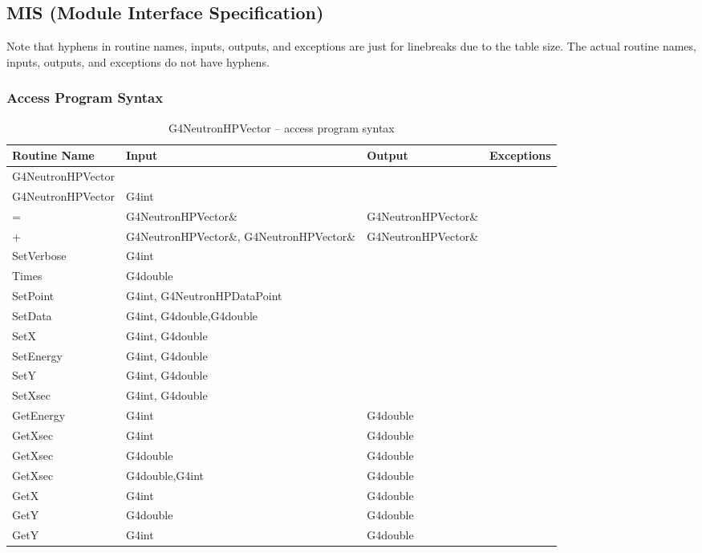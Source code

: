 \documentclass[12pt]{article}
\begin{document}
\subsection{MIS (Module Interface Specification)}
Note that hyphens in routine names, inputs, outputs, and exceptions are just for linebreaks due to the table size. The actual routine names, inputs, outputs, and exceptions do not have hyphens.

\subsubsection{Access Program Syntax}%
\begin{longtable}{p{}p{}p{}p{}}
\caption{G4NeutronHPVector -- access program syntax}\label{Table_NeutronHPVectorInterface}\\
\toprule
\bf Routine Name & \bf Input & \bf Output & \bf Exceptions \\\midrule
\arrayrulecolor{lightgray}
G4NeutronHPVector & & & \\\hline
G4NeutronHPVector & G4int & & \\\hline
= & G4NeutronHPVector\& & G4NeutronHPVector\& &\\\hline
+ & G4NeutronHPVector\&, G4NeutronHPVector\& & G4NeutronHPVector\& &\\\hline
SetVerbose & G4int & & \\\hline
Times &G4double & & \\\hline
SetPoint  &G4int, G4NeutronHPDataPoint & & \\\hline
SetData & G4int, G4double,G4double& & \\\hline
SetX & G4int, G4double & & \\\hline
SetEnergy & G4int, G4double & & \\\hline
SetY & G4int, G4double & & \\\hline
SetXsec & G4int, G4double & & \\\hline
GetEnergy & G4int & G4double & \\\hline
GetXsec & G4int & G4double & \\\hline
GetXsec & G4double & G4double & \\\hline
GetXsec & G4double,G4int & G4double & \\\hline
GetX & G4int & G4double & \\\hline
GetY & G4double & G4double & \\\hline
GetY & G4int & G4double & \\\hline

\end{longtable}
\end{document}
